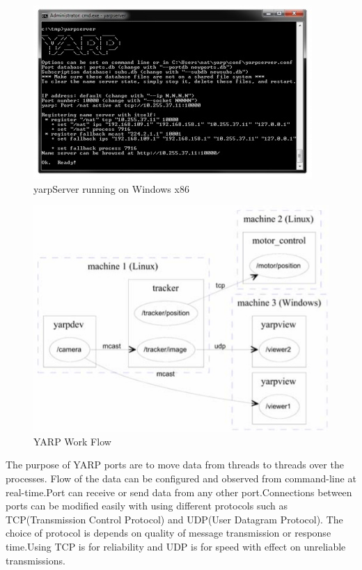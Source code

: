 \documentclass[reqno,12pt,oneside]{report}
\begin{document}
\begin{figure}[!h]
\begin{center}
\includegraphics[scale=1.0]{yarpServer.jpg}
\caption{yarpServer running on Windows x86}
\end{center}
\end{figure}

\begin{figure}[!h]
\begin{center}
\includegraphics[scale=0.4]{network.jpg}
\caption{YARP Work Flow}
\end{center}
\end{figure}
The purpose of YARP ports are to move data from threads to threads over the processes. Flow of the data can be configured and observed from command-line at real-time.Port can receive or send data from any other port.Connections between ports can be modified easily with using different protocols such as TCP(Transmission Control Protocol) and UDP(User Datagram Protocol). The choice of protocol is depends on quality of message transmission or response time.Using TCP is for reliability and UDP is for speed with effect on unreliable transmissions.
\newpage
\end{document}
